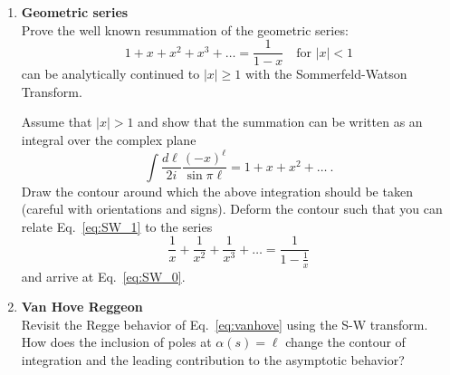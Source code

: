 
\begin{enumerate}
\item \textbf{Geometric series} \\
Prove the well known resummation of the geometric series:
    \begin{equation}\label{eq:SW_0}
         1 + x + x^2 + x^3 + \dots =  \frac{1}{1-x} \quad \text{for } |x| < 1
    \end{equation}
can be analytically continued to $|x| \geq 1$ with the Sommerfeld-Watson Transform.

Assume that $|x| > 1$ and show that the summation can be written as an integral over the complex plane
    \begin{equation}
        \label{eq:SW_1}
         \int \frac{d\ell}{2i} \frac{(-x)^\ell}{\sin \pi \ell} = 1 + x + x^2 + \dots ~.
    \end{equation}
Draw the contour around which the above integration should be taken (careful with orientations and signs).
Deform the contour such that you can relate Eq.~\ref{eq:SW_1} to the series
    \begin{equation}
        \frac{1}{x} + \frac{1}{x^2} + \frac{1}{x^3} + \dots = \frac{1}{1- \frac{1}{x}}
    \end{equation}
and arrive at Eq.~\ref{eq:SW_0}.

\item \textbf{Van Hove Reggeon} \\
Revisit the Regge behavior of Eq.~\ref{eq:vanhove} using the S-W transform. How does the inclusion of poles at $\alpha(s) = \ell$ change the contour of integration and the leading contribution to the asymptotic behavior?
\end{enumerate}